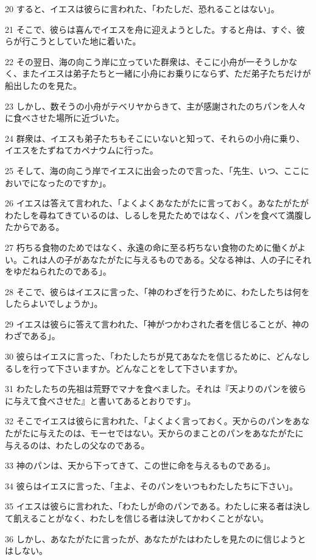 \par 20 すると、イエスは彼らに言われた、「わたしだ、恐れることはない」。
\par 21 そこで、彼らは喜んでイエスを舟に迎えようとした。すると舟は、すぐ、彼らが行こうとしていた地に着いた。
\par 22 その翌日、海の向こう岸に立っていた群衆は、そこに小舟が一そうしかなく、またイエスは弟子たちと一緒に小舟にお乗りにならず、ただ弟子たちだけが船出したのを見た。
\par 23 しかし、数そうの小舟がテベリヤからきて、主が感謝されたのちパンを人々に食べさせた場所に近づいた。
\par 24 群衆は、イエスも弟子たちもそこにいないと知って、それらの小舟に乗り、イエスをたずねてカペナウムに行った。
\par 25 そして、海の向こう岸でイエスに出会ったので言った、「先生、いつ、ここにおいでになったのですか」。
\par 26 イエスは答えて言われた、「よくよくあなたがたに言っておく。あなたがたがわたしを尋ねてきているのは、しるしを見たためではなく、パンを食べて満腹したからである。
\par 27 朽ちる食物のためではなく、永遠の命に至る朽ちない食物のために働くがよい。これは人の子があなたがたに与えるものである。父なる神は、人の子にそれをゆだねられたのである」。
\par 28 そこで、彼らはイエスに言った、「神のわざを行うために、わたしたちは何をしたらよいでしょうか」。
\par 29 イエスは彼らに答えて言われた、「神がつかわされた者を信じることが、神のわざである」。
\par 30 彼らはイエスに言った、「わたしたちが見てあなたを信じるために、どんなしるしを行って下さいますか。どんなことをして下さいますか。
\par 31 わたしたちの先祖は荒野でマナを食べました。それは『天よりのパンを彼らに与えて食べさせた』と書いてあるとおりです」。
\par 32 そこでイエスは彼らに言われた、「よくよく言っておく。天からのパンをあなたがたに与えたのは、モーセではない。天からのまことのパンをあなたがたに与えるのは、わたしの父なのである。
\par 33 神のパンは、天から下ってきて、この世に命を与えるものである」。
\par 34 彼らはイエスに言った、「主よ、そのパンをいつもわたしたちに下さい」。
\par 35 イエスは彼らに言われた、「わたしが命のパンである。わたしに来る者は決して飢えることがなく、わたしを信じる者は決してかわくことがない。
\par 36 しかし、あなたがたに言ったが、あなたがたはわたしを見たのに信じようとはしない。
